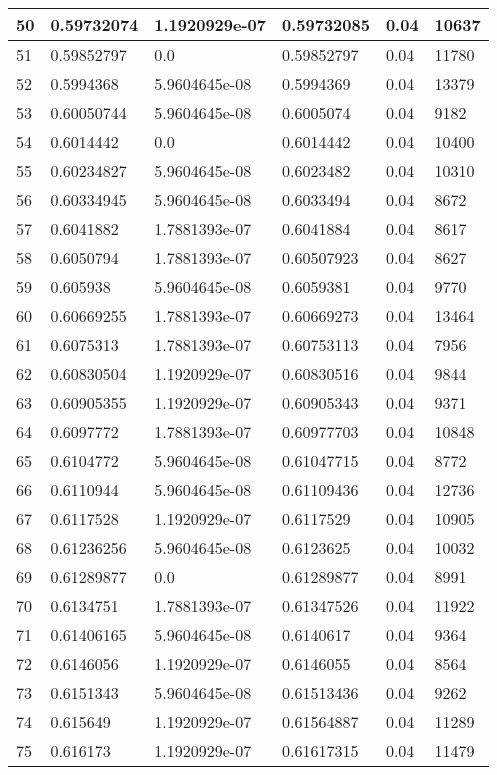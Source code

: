 \begin{longtable}{|l|l|l|l|l|l|}
50 & 0.59732074 & 1.1920929e-07 & 0.59732085 & 0.04 & 10637 \\ \hline 
51 & 0.59852797 & 0.0 & 0.59852797 & 0.04 & 11780 \\ \hline 
52 & 0.5994368 & 5.9604645e-08 & 0.5994369 & 0.04 & 13379 \\ \hline 
53 & 0.60050744 & 5.9604645e-08 & 0.6005074 & 0.04 & 9182 \\ \hline 
54 & 0.6014442 & 0.0 & 0.6014442 & 0.04 & 10400 \\ \hline 
55 & 0.60234827 & 5.9604645e-08 & 0.6023482 & 0.04 & 10310 \\ \hline 
56 & 0.60334945 & 5.9604645e-08 & 0.6033494 & 0.04 & 8672 \\ \hline 
57 & 0.6041882 & 1.7881393e-07 & 0.6041884 & 0.04 & 8617 \\ \hline 
58 & 0.6050794 & 1.7881393e-07 & 0.60507923 & 0.04 & 8627 \\ \hline 
59 & 0.605938 & 5.9604645e-08 & 0.6059381 & 0.04 & 9770 \\ \hline 
60 & 0.60669255 & 1.7881393e-07 & 0.60669273 & 0.04 & 13464 \\ \hline 
61 & 0.6075313 & 1.7881393e-07 & 0.60753113 & 0.04 & 7956 \\ \hline 
62 & 0.60830504 & 1.1920929e-07 & 0.60830516 & 0.04 & 9844 \\ \hline 
63 & 0.60905355 & 1.1920929e-07 & 0.60905343 & 0.04 & 9371 \\ \hline 
64 & 0.6097772 & 1.7881393e-07 & 0.60977703 & 0.04 & 10848 \\ \hline 
65 & 0.6104772 & 5.9604645e-08 & 0.61047715 & 0.04 & 8772 \\ \hline 
66 & 0.6110944 & 5.9604645e-08 & 0.61109436 & 0.04 & 12736 \\ \hline 
67 & 0.6117528 & 1.1920929e-07 & 0.6117529 & 0.04 & 10905 \\ \hline 
68 & 0.61236256 & 5.9604645e-08 & 0.6123625 & 0.04 & 10032 \\ \hline 
69 & 0.61289877 & 0.0 & 0.61289877 & 0.04 & 8991 \\ \hline 
70 & 0.6134751 & 1.7881393e-07 & 0.61347526 & 0.04 & 11922 \\ \hline 
71 & 0.61406165 & 5.9604645e-08 & 0.6140617 & 0.04 & 9364 \\ \hline 
72 & 0.6146056 & 1.1920929e-07 & 0.6146055 & 0.04 & 8564 \\ \hline 
73 & 0.6151343 & 5.9604645e-08 & 0.61513436 & 0.04 & 9262 \\ \hline 
74 & 0.615649 & 1.1920929e-07 & 0.61564887 & 0.04 & 11289 \\ \hline 
75 & 0.616173 & 1.1920929e-07 & 0.61617315 & 0.04 & 11479 \\ \hline 
\end{longtable}